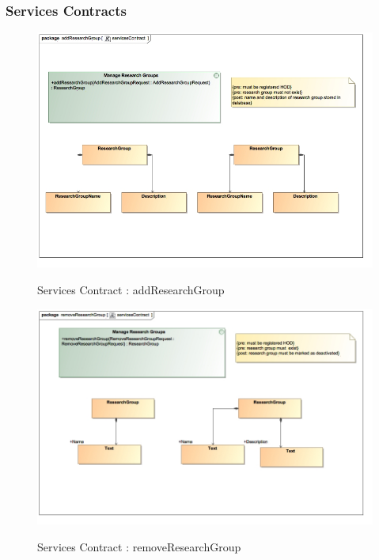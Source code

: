 \documentclass{article}
\begin{document}
	\subsubsection{Services Contracts}

		\begin{figure}[H]
			\includegraphics[width=\textwidth]{Vuyani_Diagrams/servicesContractAddResearchGroup.jpg}  \\
			\caption{Services Contract : addResearchGroup}
		\end{figure}
		\begin{figure}[H]
			\includegraphics[width=\textwidth]{Vuyani_Diagrams/servicesContractRemoveResearchGroup.jpg}  \\
			\caption{Services Contract : removeResearchGroup}
		\end{figure}
\end{document}
